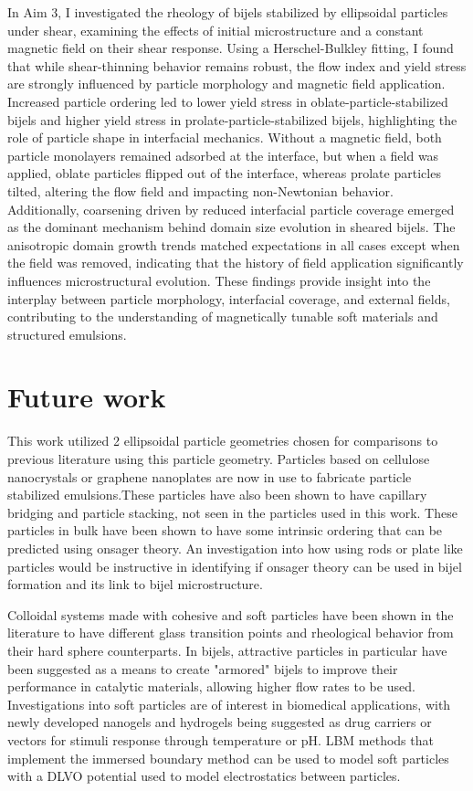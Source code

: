 In Aim 3, I investigated the rheology of bijels stabilized by ellipsoidal particles under shear, examining the effects of initial microstructure and a 
constant magnetic field on their shear response. Using a Herschel-Bulkley fitting, I found that while shear-thinning behavior remains robust, the 
flow index and yield stress are strongly influenced by particle morphology and magnetic field application. Increased particle ordering led to 
lower yield stress in oblate-particle-stabilized bijels and higher yield stress in prolate-particle-stabilized bijels, highlighting the role of particle 
shape in interfacial mechanics. Without a magnetic field, both particle monolayers remained adsorbed at the interface, but when a field was applied, 
oblate particles flipped out of the interface, whereas prolate particles tilted, altering the flow field and impacting non-Newtonian behavior. Additionally, 
coarsening driven by reduced interfacial particle coverage emerged as the dominant mechanism behind domain size evolution in sheared bijels. The anisotropic 
domain growth trends matched expectations in all cases except when the field was removed, indicating that the history of field application significantly influences 
microstructural evolution. These findings provide insight into the interplay between particle morphology, interfacial coverage, and external fields, contributing 
to the understanding of magnetically tunable soft materials and structured emulsions.

\section{Future work}

This work utilized 2 ellipsoidal particle geometries chosen for comparisons to previous literature using this 
particle geometry. Particles based on cellulose nanocrystals or graphene nanoplates are now in use to fabricate
particle stabilized emulsions.These particles have also been shown to have capillary bridging and particle stacking,
not seen in the particles used in this work. These particles in bulk have been shown to have some intrinsic ordering
that can be predicted using onsager theory. An investigation into how using rods or plate like particles would be 
instructive in identifying if onsager theory can be used in bijel formation and its link to bijel microstructure. 
\cite{tan_2d_2021}

Colloidal systems made with cohesive and soft particles have been shown in the literature to have different glass 
transition points and rheological behavior from their hard sphere counterparts. In bijels, attractive particles in 
particular have been suggested as a means to create "armored" bijels to improve their performance in catalytic materials, 
allowing higher flow rates to be used. Investigations into soft particles are of interest in biomedical
applications, with newly developed nanogels and hydrogels being suggested as drug carriers or vectors for stimuli 
response through temperature or pH. LBM methods that implement the immersed boundary method can be used to model soft
particles with a DLVO potential used to model electrostatics between particles. \cite{silva_lattice_2024}

